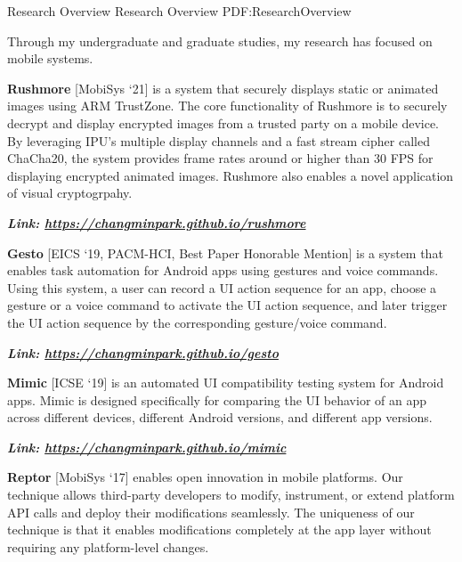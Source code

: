 \documentclass[letterpaper,MMMyyyy,nonstopmode]{simpleresumecv}
\begin{document}
\begin{Body}
\vspace{-0.5ex}
\Section
{Research Overview}
{Research Overview}
{PDF:ResearchOverview}

\Entry
Through my undergraduate and graduate studies, my research has focused on mobile systems.

\Gap
\BulletItem
\textbf{Rushmore} [MobiSys `21] is a system that securely displays static or animated images 
using ARM TrustZone. The core functionality of Rushmore is to securely decrypt and display encrypted 
images from a trusted party on a mobile device. By leveraging IPU's multiple display channels and
a fast stream cipher called ChaCha20, the system provides frame rates around or higher than 30 FPS 
for displaying encrypted animated images. Rushmore also enables a novel application of visual 
cryptogrpahy.

\hspace{2ex}
\textbf{\textit{Link: \href{https://changminpark.github.io/rushmore}
{https://changminpark.github.io/rushmore}}}
\hfill

\vspace{0.5ex}
\Gap
\BulletItem
\textbf{Gesto} [EICS `19, PACM-HCI, Best Paper Honorable Mention] is a system that enables task 
automation for Android apps using gestures 
and voice commands. Using this system, a user can record a UI action sequence for an app, 
choose a gesture or a voice command to activate the UI action sequence, and later trigger 
the UI action sequence by the corresponding gesture/voice command.

\hspace{2ex}
\textbf{\textit{Link: \href{https://changminpark.github.io/gesto}
{https://changminpark.github.io/gesto}}}
\hfill

\vspace{0.5ex}
\Gap
\BulletItem
\textbf{Mimic} [ICSE `19] is an automated UI compatibility testing system for Android apps. 
Mimic is designed specifically for comparing the UI behavior of an app across different 
devices, different Android versions, and different app versions.

\hspace{2ex}
\textbf{\textit{Link: \href{https://changminpark.github.io/mimic}{https://changminpark.github.io/mimic}}}
\hfill

\vspace{0.5ex}
\Gap
\BulletItem
\textbf{Reptor} [MobiSys `17] enables open innovation in mobile platforms. Our technique allows third-party 
developers to modify, instrument, or extend platform API calls and deploy their modifications 
seamlessly. The uniqueness of our technique is that it enables modifications completely at 
the app layer without requiring any platform-level changes. 


\end{Body}
\end{document}
